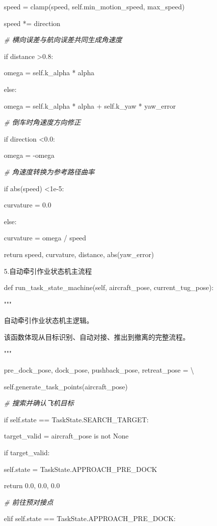         speed = clamp(speed, self.min\_motion\_speed, max\_speed)

        speed *= direction

        \emph{\# 横向误差与航向误差共同生成角速度}

        if distance \textgreater 0.8:

            omega = self.k\_alpha * alpha

        else:

            omega = self.k\_alpha * alpha + self.k\_yaw * yaw\_error

        \emph{\# 倒车时角速度方向修正}

        if direction \textless 0.0:

            omega = -omega

        \emph{\# 角速度转换为参考路径曲率}

        if abs(speed) \textless 1e-5:

            curvature = 0.0

        else:

            curvature = omega / speed

        return speed, curvature, distance, abs(yaw\_error)

5.自动牵引作业状态机主流程

    def run\_task\_state\_machine(self, aircraft\_pose, current\_tug\_pose):

        """

        自动牵引作业状态机主逻辑。

        该函数体现从目标识别、自动对接、推出到撤离的完整流程。

        """

        pre\_dock\_pose, dock\_pose, pushback\_pose, retreat\_pose = \textbackslash{}

            self.generate\_task\_points(aircraft\_pose)

        \emph{\# 搜索并确认飞机目标}

        if self.state == TaskState.SEARCH\_TARGET:

            target\_valid = aircraft\_pose is not None

            if target\_valid:

                self.state = TaskState.APPROACH\_PRE\_DOCK

            return 0.0, 0.0, 0.0

        \emph{\# 前往预对接点}

        elif self.state == TaskState.APPROACH\_PRE\_DOCK:

